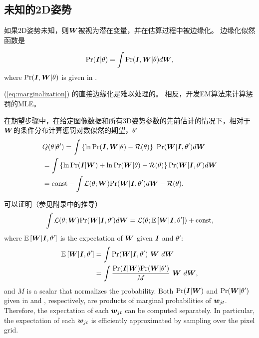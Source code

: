 \subsection{未知的2D姿势}\label{sec:unknown}

如果2D姿势未知，则${\bm{W}}$被视为潜在变量，并在估算过程中被边缘化。 边缘化似然函数是

\begin{align}
\mbox{Pr}({\bm{I}}|\theta) = \int\mbox{Pr}({\bm{I}},{\bm{W}}|\theta)d{\bm{W}}, \label{eq:marginalization}
\end{align}
where $\mbox{Pr}({\bm{I}},{\bm{W}}|\theta)$ is given in .

(\ref{eq:marginalization}) 的直接边缘化是难以处理的。
相反，开发EM算法来计算惩罚的MLE。

在期望步骤中，在给定图像数据和所有3D姿势参数的先前估计的情况下，相对于${\bm{W}}$的条件分布计算惩罚对数似然的期望，$\theta'$
\begin{align}
&Q(\theta|\theta') = \int \left\{\ln\mbox{Pr}({\bm{I}},{\bm{W}}|\theta) - \mathcal{R}(\theta)\right\} ~ \mbox{Pr}({\bm{W}}|{\bm{I}},\theta') d{\bm{W}} \nonumber \\
&= \int \left\{\ln\mbox{Pr}({\bm{I}}|{\bm{W}}) + \ln\mbox{Pr}({\bm{W}}|\theta) - \mathcal{R}(\theta)\right\} \mbox{Pr}({\bm{W}}|{\bm{I}},\theta') d{\bm{W}} \nonumber \\
&= \mbox{const} - \int \mathcal{L}(\theta;{\bm{W}}) \mbox{Pr}({\bm{W}}|{\bm{I}},\theta') d{\bm{W}} - \mathcal{R}(\theta).
\end{align}

可以证明（参见附录中的推导）
\begin{align}\label{eq:der1}
\int \mathcal{L}(\theta;{\bm{W}}) \mbox{Pr}({\bm{W}}|{\bm{I}},\theta') d{\bm{W}} = \mathcal{L}(\theta;\mathbb{E}\left[{\bm{W}}|{\bm{I}},\theta'\right]) + \mbox{const},
\end{align}
where $\mathbb{E}\left[{\bm{W}}|{\bm{I}},\theta'\right]$ is the expectation of ${\bm{W}}$ given ${\bm{I}}$ and $\theta'$:
\begin{align}\label{eq:der2}
\mathbb{E}\left[{\bm{W}}|{\bm{I}},\theta'\right]
&= \int \mbox{Pr}({\bm{W}}|{\bm{I}},\theta')~ {\bm{W}} ~ d{\bm{W}} \nonumber \\
&= \int \frac{\mbox{Pr}({\bm{I}}|{\bm{W}})\mbox{Pr}({\bm{W}}|\theta')}{M} ~ {\bm{W}} ~ d{\bm{W}},
\end{align}
and $M$ is a scalar that normalizes the probability. 
Both $\mbox{Pr}({\bm{I}}|{\bm{W}})$ and $\mbox{Pr}({\bm{W}}|\theta')$ given in  and , respectively, are products of marginal probabilities of ${\bm{w}}_{jt}$. Therefore,
the expectation of each ${\bm{w}}_{jt}$ can be computed separately. In particular, the expectation of each ${\bm{w}}_{jt}$ is efficiently approximated by sampling over the pixel grid.

